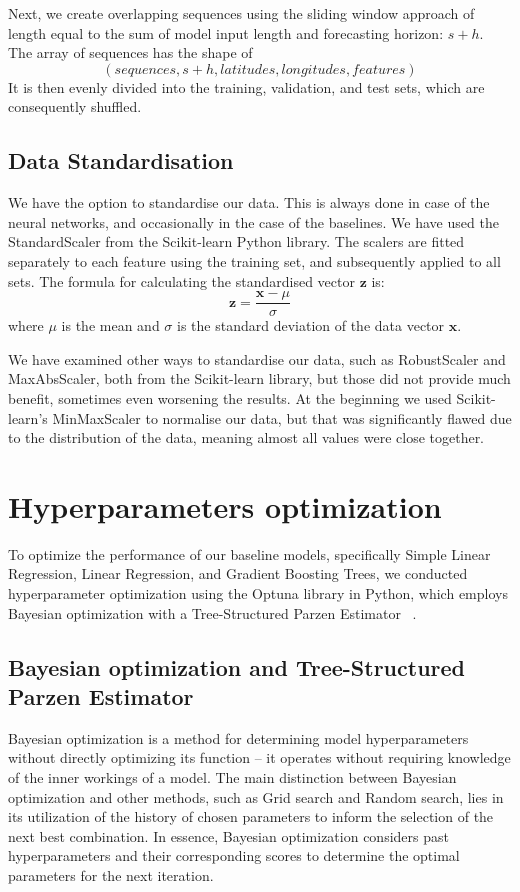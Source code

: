 Next, we create overlapping sequences using the sliding window approach of length equal to the sum of model input length and forecasting horizon: $s + h$. The array of sequences has the shape of 
\[
    (sequences, s+h, latitudes, longitudes, features)
\] 
It is then evenly divided into the training, validation, and test sets, which are consequently shuffled.

\subsection{Data Standardisation}
We have the option to standardise our data. This is always done in case of the neural networks, and occasionally in the case of the baselines. We have used the StandardScaler from the Scikit-learn \cite{scikit-learn} Python library. The scalers are fitted separately to each feature using the training set, and subsequently applied to all sets. The formula for calculating the standardised vector $\mathbf{z}$ is:
\[
    \mathbf{z} = \frac{\mathbf{x} - \mu}{\sigma}
\]
where $\mu$ is the mean and $\sigma$ is the standard deviation of the data vector $\mathbf{x}$.

We have examined other ways to standardise our data, such as RobustScaler and MaxAbsScaler, both from the Scikit-learn library, but those did not provide much benefit, sometimes even worsening the results. At the beginning we used Scikit-learn's MinMaxScaler to normalise our data, but that was significantly flawed due to the distribution of the data, meaning almost all values were close together.

\section{Hyperparameters optimization} \label{chap:hpo}

To optimize the performance of our baseline models, specifically Simple Linear Regression, Linear Regression, and Gradient Boosting Trees, we conducted hyperparameter optimization using the Optuna library in Python, which employs Bayesian optimization \cite{snoek2012practical} with a Tree-Structured Parzen Estimator ~\cite{watanabe2023treestructured}.

\subsection{Bayesian optimization and Tree-Structured Parzen Estimator}
Bayesian optimization is a method for determining model hyperparameters without directly optimizing its function -- it operates without requiring knowledge of the inner workings of a model. The main distinction between Bayesian optimization and other methods, such as Grid search and Random search, lies in its utilization of the history of chosen parameters to inform the selection of the next best combination. In essence, Bayesian optimization considers past hyperparameters and their corresponding scores to determine the optimal parameters for the next iteration.

